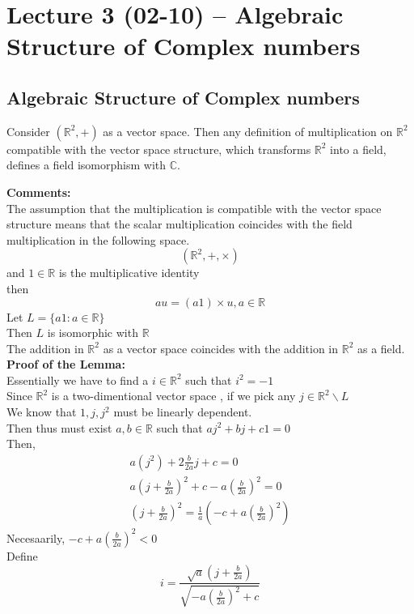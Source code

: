 \section{Lecture 3 (02-10) -- {Algebraic Structure of Complex numbers}}
\subsection{Algebraic Structure of Complex numbers}
\begin{lemma}[]{}
Consider $ (\mathbb{R}^2,+) $ as a vector space. Then any definition of multiplication on $ \mathbb{R}^2 $ compatible with the vector space structure, which transforms $ \mathbb{R}^2 $ into a field, defines a field isomorphism with $ \mathbb{C} $.

\end{lemma}
\textbf{Comments:}
\\The assumption that the multiplication is compatible with the vector space structure means that the scalar multiplication coincides with the field multiplication in the following space.
$$
    (\mathbb{R}^2,+,\times)
$$ 
and $ 1\in \mathbb{R} $ is the multiplicative identity 
\\then$$
 au=(a1)\times u, a\in \mathbb{R}   
$$ 
Let $ L=\{a1: a\in \mathbb{R}\} $
\\Then $ L $ is isomorphic with $ \mathbb{R} $ 
\\The addition in $ \mathbb{R}^2 $ as a vector space coincides with the addition in $ \mathbb{R}^2  $ as a field.
\\\textbf{Proof of the Lemma:}
\\Essentially we have to find a $ i \in \mathbb{R}^2 $ such that $ i^2=-1 $ 
\\Since $ \mathbb{R}^2 $ is a two-dimentional vector space , if we pick any $ j\in \mathbb{R}^2\backslash L $ 
\\We know that $ 1,j,j^2 $ must be linearly dependent.
\\Then thus must exist $ a,b\in \mathbb{R} $ such that $ aj^2+bj+c1=0 $ 
\\Then, \begin{align*}{}{}
a(j^2)+2\frac{b}{2a}j+c=0\\
a{(j+\frac{b}{2a})}^2+c-a{(\frac{b}{2a})}^2=0\\
{(j+\frac{b}{2a})}^2=\frac{1}{a}(-c+a{(\frac{b}{2a})}^2)
\end{align*}
Necesaarily, $ -c+a{(\frac{b}{2a})}^2<0 $
\\Define 
$$
    i=\frac{\sqrt{a}(j+\frac{b}{2a})}{\sqrt{-a{(\frac{b}{2a})}^2+c}}
$$

